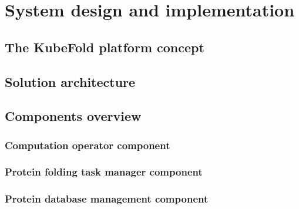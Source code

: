 \chapter{System design and implementation}


\section{The KubeFold platform concept}


\section{Solution architecture}


\section{Components overview}

\subsection{Computation operator component}

\subsection{Protein folding task manager component}

\subsection{Protein database management component}
